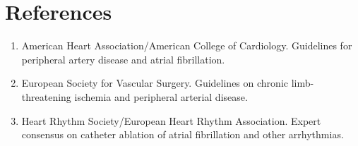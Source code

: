 \section*{References}
\begin{enumerate}
\item American Heart Association/American College of Cardiology. Guidelines for peripheral artery disease and atrial fibrillation.
\item European Society for Vascular Surgery. Guidelines on chronic limb-threatening ischemia and peripheral arterial disease.
\item Heart Rhythm Society/European Heart Rhythm Association. Expert consensus on catheter ablation of atrial fibrillation and other arrhythmias.
\end{enumerate}
